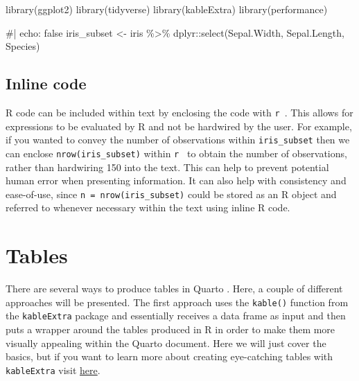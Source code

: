 \documentclass[
  letterpaper,
  DIV=11,
  numbers=noendperiod]{scrartcl}
\newenvironment{Shaded}{\begin{snugshade}}{\end{snugshade}}
\newcommand{\CommentTok}[1]{\textcolor[rgb]{0.37,0.37,0.37}{#1}}
\newcommand{\FunctionTok}[1]{\textcolor[rgb]{0.28,0.35,0.67}{#1}}
\newcommand{\NormalTok}[1]{\textcolor[rgb]{0.00,0.23,0.31}{#1}}
\newcommand{\OtherTok}[1]{\textcolor[rgb]{0.00,0.23,0.31}{#1}}
\newcommand{\SpecialCharTok}[1]{\textcolor[rgb]{0.37,0.37,0.37}{#1}}
\begin{document}
\begin{tcolorbox}
\begin{Shaded}
\begin{Highlighting}[]
\FunctionTok{library}\NormalTok{(ggplot2) }
\FunctionTok{library}\NormalTok{(tidyverse)}
\FunctionTok{library}\NormalTok{(kableExtra) }
\FunctionTok{library}\NormalTok{(performance) }
\end{Highlighting}
\end{Shaded}

\begin{Shaded}
\begin{Highlighting}[]
\CommentTok{\#| echo: false}
\NormalTok{ iris\_subset }\OtherTok{\textless{}{-}}\NormalTok{ iris }\SpecialCharTok{\%\textgreater{}\%}
\NormalTok{   dplyr}\SpecialCharTok{::}\FunctionTok{select}\NormalTok{(Sepal.Width, Sepal.Length, Species) }
\end{Highlighting}
\end{Shaded}

\end{tcolorbox}

\subsection{Inline code}\label{inline-code}

R code can be included within text by enclosing the code with
\texttt{\textasciigrave{}r\ \textasciigrave{}}. This allows for
expressions to be evaluated by R and not be hardwired by the user. For
example, if you wanted to convey the number of observations within
\texttt{iris\_subset} then we can enclose \texttt{nrow(iris\_subset)}
within \texttt{\textasciigrave{}r\ \textasciigrave{}} to obtain the
number of observations, rather than hardwiring 150 into the text. This
can help to prevent potential human error when presenting information.
It can also help with consistency and ease-of-use, since
\texttt{n\ =\ nrow(iris\_subset)} could be stored as an R object and
referred to whenever necessary within the text using inline R code.

\section{Tables}\label{tables}

There are several ways to produce tables in Quarto . Here, a couple of
different approaches will be presented. The first approach uses the
\texttt{kable()} function from the \texttt{kableExtra} package and
essentially receives a data frame as input and then puts a wrapper
around the tables produced in R in order to make them more visually
appealing within the Quarto document. Here we will just cover the
basics, but if you want to learn more about creating eye-catching tables
with \texttt{kableExtra} visit
\href{https://bookdown.org/yihui/rmarkdown-cookbook/kableextra.html}{here}.
\end{document}
